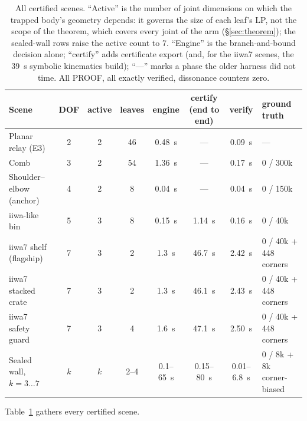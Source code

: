 \documentclass[10pt,twocolumn,letterpaper]{article}
\newcommand{\vone}[1]{#1}  %
\begin{document}
\begin{table}[t]
\centering\small
\caption{All certified scenes. \vone{``Active'' is the number of joint dimensions on which the trapped body's geometry depends: it governs the size of each leaf's LP, not the scope of the theorem, which covers every joint of the arm (\S\ref{sec:theorem}); the sealed-wall rows raise the active count to 7.} ``Engine'' is the branch-and-bound decision alone; ``certify'' adds certificate export (and, for the iiwa7 scenes, the 39~s symbolic kinematics build); ``---'' marks a phase the older harness did not time. All PROOF, all exactly verified, dissonance counters zero.}
\label{tab:summary}
\begin{tabular}{@{}lccccccl@{}}
\toprule
Scene & DOF & active & leaves & engine & certify (end to end) & verify & ground truth \\
\midrule
Planar relay (E3)        & 2 & 2 & 46  & 0.48~s & ---     & 0.09~s & --- \\
Comb                     & 3 & 2 & 54  & 1.36~s & ---     & 0.17~s & 0 / 300k \\
Shoulder--elbow (anchor) & 4 & 2 & 8   & 0.04~s & ---     & 0.04~s & 0 / 150k \\
iiwa-like bin            & 5 & 3 & 8   & 0.15~s & 1.14~s  & 0.16~s & 0 / 40k \\
iiwa7 shelf (flagship)   & 7 & 3 & 2   & 1.3~s  & 46.7~s  & 2.42~s & 0 / 40k + 448 corners \\
iiwa7 stacked crate      & 7 & 3 & 2   & 1.3~s  & 46.1~s  & 2.43~s & 0 / 40k + 448 corners \\
iiwa7 safety guard       & 7 & 3 & 4   & 1.6~s  & 47.1~s  & 2.50~s & 0 / 40k + 448 corners \\
Sealed wall, $k=3\ldots7$ & $k$ & $k$ & 2--4 & 0.1--65~s & 0.15--80~s & 0.01--6.8~s & 0 / 8k + 8k corner-biased \\
\bottomrule
\end{tabular}
\end{table}

Table~\ref{tab:summary} gathers every certified scene.
\end{document}
